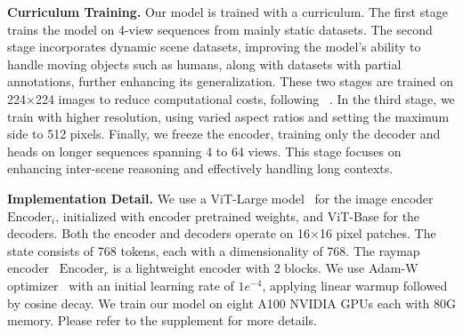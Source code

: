 \vspace{.5em}\noindent\textbf{Curriculum Training.}
Our model is trained with a curriculum. The first stage trains the model on 4-view sequences from mainly static datasets.
The second stage incorporates dynamic scene datasets, improving the model's ability to handle moving objects such as humans, along with  datasets with partial annotations, further enhancing its generalization. 
These two stages are trained on 
224$\times$224 images to reduce computational costs, following \duster{}~\cite{wang2024dust3r}.
In the third stage, we train with higher resolution, using varied aspect ratios and setting the maximum side to 512 pixels.
Finally, we freeze the encoder, training only the decoder and heads on longer sequences spanning 4 to 64 views. This stage focuses on enhancing inter-scene reasoning and effectively handling long contexts. %



\vspace{.5em}\noindent\textbf{Implementation Detail.}
We use a ViT-Large model~\cite{dosovitskiy2020image} for the image encoder $\mathrm{Encoder}_i$, initialized with \duster{} encoder pretrained weights, and ViT-Base for the decoders. Both the encoder and decoders operate on 16$\times$16 pixel patches. The state consists of 768 tokens, each with a dimensionality of 768. The raymap encoder~ $\mathrm{Encoder}_r$ is a lightweight encoder with 2 blocks. 
We use Adam-W optimizer~\cite{loshchilov2017decoupled} with an initial learning rate of $1e^{-4}$, applying linear warmup followed by cosine decay. We train our model on eight A100 NVIDIA GPUs each with 80G memory. 
Please refer to the supplement for more details.


